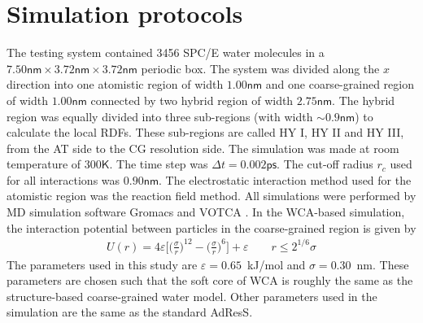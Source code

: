\documentclass[aip,jcp,a4paper,reprint,onecolumn]{revtex4-1}
\newcommand{\bluec}[1]{{\color{blue} #1}}
\begin{document}
\section{Simulation protocols}
\label{app:2}
The testing system contained 3456 SPC/E \cite{berendsen1987missing}
water molecules in a $7.50\textsf{nm}\times 3.72\textsf{nm}\times
3.72\textsf{nm}$ periodic box. The system was divided along the $x$ direction
into one atomistic region of width $1.00\textsf{nm}$ and one
coarse-grained region of width $1.00\textsf{nm}$ connected by two
hybrid region of width $2.75\textsf{nm}$.
The hybrid region was equally divided into three sub-regions (with width $\sim 0.9\textsf{nm}$)
to calculate the local RDFs.
These sub-regions are called HY I, HY II and HY III, from the AT side to the CG resolution side.
The simulation was made at
room temperature of $300\textsf{K}$. The time step was $\Delta t =
0.002\textsf{ps}$. The cut-off radius $r_{c}$ used for all interactions was
$0.90\textsf{nm}$. The electrostatic interaction method used for the
atomistic region was the reaction field method. All simulations were
performed by MD simulation software Gromacs \cite{gromacs}
and VOTCA \cite{ruehle2009versatile}.
In the WCA-based simulation, the interaction potential between particles in the coarse-grained region is given by
\bluec{
\begin{align}
  U(r) = 4\varepsilon
  \big[
  \big(\frac\sigma r\big)^{12}
  -
  \big(\frac\sigma r\big)^{6}
  \big]
  + \varepsilon
  \qquad  r\leq 2^{1/6}\sigma
\end{align}
}
The parameters used in this study are $\varepsilon = 0.65$~\textsf{kJ/mol}
and $\sigma = 0.30$~\textsf{nm}. These parameters are chosen such that
the soft core of WCA is roughly the same as the structure-based coarse-grained
water model.
Other parameters used in the simulation are the
same as the standard AdResS.
\end{document}
